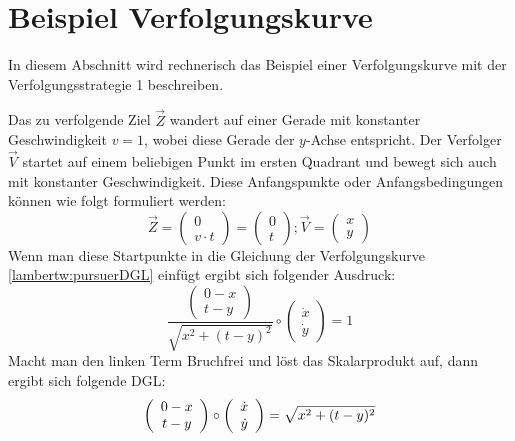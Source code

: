 %
%
%
\section{Beispiel Verfolgungskurve
\label{lambertw:section:teil4}}
In diesem Abschnitt wird rechnerisch das Beispiel einer Verfolgungskurve mit der Verfolgungsstrategie 1 beschreiben.

Das zu verfolgende Ziel \(\overrightarrow{Z}\) wandert auf einer Gerade mit konstanter Geschwindigkeit \(v = 1\), wobei diese Gerade der \(y\)-Achse entspricht. Der Verfolger \(\overrightarrow{V}\) startet auf einem beliebigen Punkt im ersten Quadrant und bewegt sich auch mit konstanter Geschwindigkeit. Diese Anfangspunkte oder Anfangsbedingungen können wie folgt formuliert werden:
\begin{equation}
	\overrightarrow{Z}
	=
	\left( \begin{array}{c} 0 \\ v \cdot t \end{array} \right)
	=
	\left( \begin{array}{c} 0 \\ t \end{array} \right)
	;
	\overrightarrow{V}
	=
	\left( \begin{array}{c} x \\ y \end{array} \right)
	\label{lambertw:Anfangspunkte}
\end{equation}
Wenn man diese Startpunkte in die Gleichung der Verfolgungskurve \eqref{lambertw:pursuerDGL} einfügt ergibt sich folgender Ausdruck:
\begin{equation}
	\frac{\left( \begin{array}{c} 0-x \\ t-y \end{array} \right)}{\sqrt{x^2 + (t-y)^2}}
	\circ
	\left(\begin{array}{c} \dot{x} \\ \dot{y} \end{array}\right)
	=
	1
	\label{lambertw:eqMitAnfangspunkte}
\end{equation}
Macht man den linken Term Bruchfrei und löst das Skalarprodukt auf, dann ergibt sich folgende DGL:
\[
	\left( \begin{array}{c} 0-x \\ t-y \end{array} \right)
	\circ
	\left(\begin{array}{c} \dot{x} \\ \dot{y} \end{array}\right)
	= \sqrt{x^2 + (t-y)^2}\\
\]
